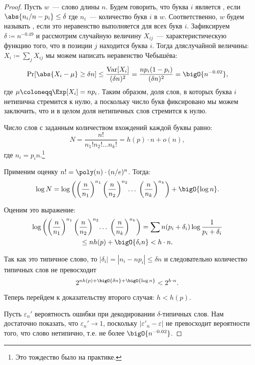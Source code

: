 \begin{proof}
    Пусть $w$~--- слово длины $n$. Будем говорить, что буква $i$ является ,
    если $\abs{n_i / n - p_i} \le \delta$ где $n_i$~--- количество букв $i$ в $w$. Соответственно, $w$
    будем называть , если это неравенство выполняется для всех букв
    $i$. Зафиксируем $\delta \coloneqq n^{-0.49}$ и рассмотрим случайную величину $X_{ij}$~---
    характеристическую функцию того, что в позиции $j$ находится буква $i$. Тогда дляслучайной величины:
    $X_i \coloneqq \sum_j X_{ij}$ мы можем написать неравенство Чебышёва:
    $$
        \Pr[\abs{X_i - \mu} \ge \delta n] \le \frac{\operatorname{Var}[X_i]}{(\delta n)^2} =
        \frac{n p_i (1 - p_i)}{(\delta n)^2} = \bigO{n^{-0.02}},
    $$
    где $\mu \coloneqq \Exp[X_i] = np_i$. Таким образом, доля слов, в которых буква $i$ нетипична
    стремится к нулю, а поскольку число букв фиксировано мы можем заключить, что и в целом доля
    нетипичных слов стремится к нулю. 
    
    Число слов с заданным количеством вхождений каждой буквы равно:
    $$
        N = \frac{n!}{n_1!n_2!\dots n_k!} = h(p) \cdot n + o(n),
    $$
    где $n_i = p_in$.\footnote{Это тождество было на практике.}
    
    Применим оценку $n! = \poly(n) \cdot (n / e)^n$. Тогда:
    $$
        \log{N} =
        \log\left(\left(\frac{n}{n_1}\right)^{n_1} \left(\frac{n}{n_2}\right)^{n_2} \!\ldots\;
          \left(\frac{n}{n_k}\right)^{n_k} \right)
        + \bigO{\log n}.
    $$

    Оценим это выражение:
    \begin{multline*}
        \log\left(\left(\frac{n}{n_1}\right)^{n_1} \left(\frac{n}{n_2}\right)^{n_2}
          \!\ldots\;\left(\frac{n}{n_k}\right)^{n_k} \right)
        = \sum n(p_i + \delta_i) \log\frac{1}{p_i + \delta_i}\\
        \le n h(p) + \bigO{\delta_i n} < h \cdot n.
    \end{multline*}
    
    Так как это типичное слово, то $|\delta_i| = |n_i - np_i| \le \delta n$ и следовательно количество
    типичных слов не превосходит
    $$
        2^{n h(p) + \bigO{\delta n} + \bigO{\log n}} < 2^{h \cdot n}.
    $$

    Теперь перейдем к доказательству второго случая: $h < h(p)$.
    
    Пусть $\varepsilon_n'$ вероятность ошибки при декодировании $\delta$-типичных слов. Нам достаточно
    показать, что $\varepsilon_n' \to 1$, поскольку $|\varepsilon'_n - \varepsilon|$ не 
    превосходит вероятности того, что слово нетипично, т.е. не более $\bigO{n^{-0.02}}$.
    

\end{proof}
